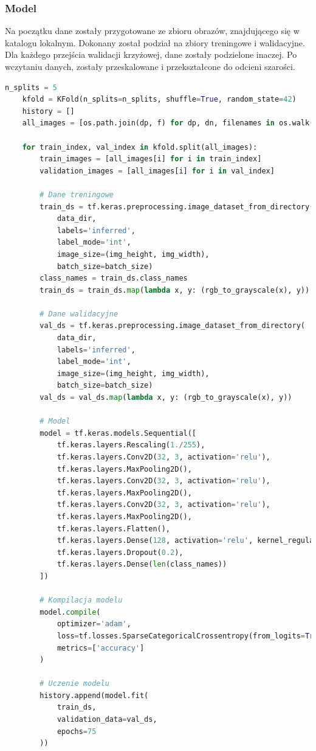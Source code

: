 \subsubsection{Model}
Na początku dane zostały przygotowane ze zbioru obrazów, znajdującego się w katalogu lokalnym.
Dokonany został podział na zbiory treningowe i walidacyjne.
Dla każdego przejścia walidacji krzyżowej, dane zostały podzielone inaczej.
Po wczytaniu danych, zostały przeskalowane i przekształcone do odcieni szarości.

\begin{lstlisting}[language=Python,caption=Listing jedenego ze skryptów tworzących model,label={tests-model-1}]
	n_splits = 5
	kfold = KFold(n_splits=n_splits, shuffle=True, random_state=42)
	history = []
	all_images = [os.path.join(dp, f) for dp, dn, filenames in os.walk(data_dir) for f in filenames if os.path.splitext(f)[1] == '.png']

	for train_index, val_index in kfold.split(all_images):
		train_images = [all_images[i] for i in train_index]
		validation_images = [all_images[i] for i in val_index]

		# Dane treningowe
		train_ds = tf.keras.preprocessing.image_dataset_from_directory(
			data_dir,
			labels='inferred',
			label_mode='int',
			image_size=(img_height, img_width),
			batch_size=batch_size)
		class_names = train_ds.class_names
		train_ds = train_ds.map(lambda x, y: (rgb_to_grayscale(x), y))

		# Dane walidacyjne
		val_ds = tf.keras.preprocessing.image_dataset_from_directory(
			data_dir,
			labels='inferred',
			label_mode='int',
			image_size=(img_height, img_width),
			batch_size=batch_size)
		val_ds = val_ds.map(lambda x, y: (rgb_to_grayscale(x), y))

		# Model
		model = tf.keras.models.Sequential([
			tf.keras.layers.Rescaling(1./255),
			tf.keras.layers.Conv2D(32, 3, activation='relu'),
			tf.keras.layers.MaxPooling2D(),
			tf.keras.layers.Conv2D(32, 3, activation='relu'),
			tf.keras.layers.MaxPooling2D(),
			tf.keras.layers.Conv2D(32, 3, activation='relu'),
			tf.keras.layers.MaxPooling2D(),
			tf.keras.layers.Flatten(),
			tf.keras.layers.Dense(128, activation='relu', kernel_regularizer=tf.keras.regularizers.l2(0.01)),
			tf.keras.layers.Dropout(0.2),
			tf.keras.layers.Dense(len(class_names))
		])

		# Kompilacja modelu
		model.compile(
			optimizer='adam',
			loss=tf.losses.SparseCategoricalCrossentropy(from_logits=True),
			metrics=['accuracy']
		)

		# Uczenie modelu
		history.append(model.fit(
			train_ds,
			validation_data=val_ds,
			epochs=75
		))
\end{lstlisting}


